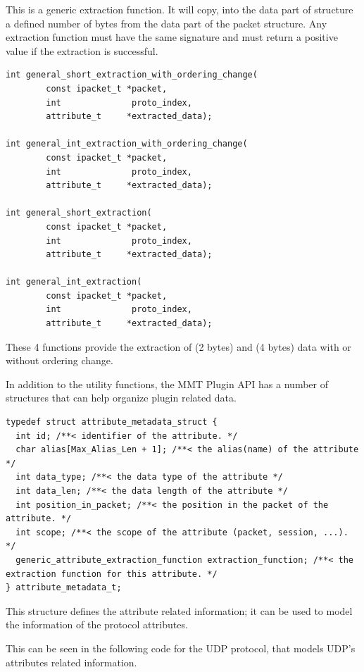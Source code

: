 This is a generic extraction function. It will copy, into the data part of  structure a defined number of bytes from the data part of the packet structure. Any extraction function must have the same signature and must return a positive value if the extraction is successful.

\begin{lstlisting}[style=Cpp]
int general_short_extraction_with_ordering_change(
        const ipacket_t *packet, 
        int              proto_index, 
        attribute_t     *extracted_data);

int general_int_extraction_with_ordering_change(
        const ipacket_t *packet, 
        int              proto_index, 
        attribute_t     *extracted_data);

int general_short_extraction(
        const ipacket_t *packet, 
        int              proto_index, 
        attribute_t     *extracted_data);

int general_int_extraction(
        const ipacket_t *packet, 
        int              proto_index, 
        attribute_t     *extracted_data);
\end{lstlisting}

These 4 functions provide the extraction of  (2 bytes) and  (4 bytes) data with or without ordering change. 

In addition to the utility functions, the MMT Plugin API has a number of structures that can help organize plugin related data. 

\begin{lstlisting}[style=Cpp]
typedef struct attribute_metadata_struct {
  int id; /**< identifier of the attribute. */
  char alias[Max_Alias_Len + 1]; /**< the alias(name) of the attribute */
  int data_type; /**< the data type of the attribute */
  int data_len; /**< the data length of the attribute */
  int position_in_packet; /**< the position in the packet of the attribute. */
  int scope; /**< the scope of the attribute (packet, session, ...). */
  generic_attribute_extraction_function extraction_function; /**< the extraction function for this attribute. */
} attribute_metadata_t;
\end{lstlisting}

This structure defines the attribute related information; it can be used to model the information of the protocol attributes. 

This can be seen in the following code for the UDP protocol, that models UDP's attributes related information.  

